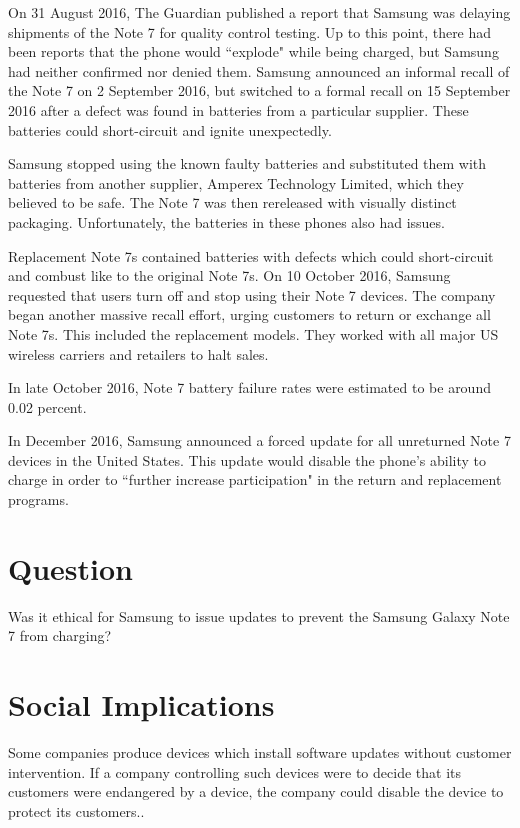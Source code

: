 \documentclass[12pt]{article}
\begin{document}
   On 31 August 2016, The Guardian published a report that Samsung was delaying shipments of the Note 7 for quality control testing\cite{guardian}. Up to this point, there had been reports that the phone would ``explode" while being charged, but Samsung had neither confirmed nor denied them\cite{yonhapnews}. Samsung announced an informal recall of the Note 7 on 2 September 2016, but switched to a formal recall on 15 September 2016 after a defect was found in batteries from a particular supplier\cite{recode}. These batteries could short-circuit and ignite unexpectedly.
   
   Samsung stopped using the known faulty batteries and substituted them with batteries from another supplier, Amperex Technology Limited, which they believed to be safe. The Note 7 was then rereleased with visually distinct packaging\cite{boxMarkedDifferent}\cite{greenBatteryIndicator}. Unfortunately, the batteries in these phones also had issues.
   
   Replacement Note 7s contained batteries with defects which could short-circuit and combust like to the original Note 7s\cite{anotherOne}. On 10 October 2016, Samsung requested that users turn off and stop using their Note 7 devices. The company began another massive recall effort, urging customers to return or exchange all Note 7s. This included the replacement models. They worked with all major US wireless carriers and retailers to halt sales.
   
   In late October 2016, Note 7 battery failure rates were estimated to be around 0.02 percent\cite{numbersOnFailureRates}.
   
   In December 2016, Samsung announced a forced update for all unreturned Note 7 devices in the United States\cite{samsungFullRecallAnnounce}\cite{facebookAutoInstallConfirmation}. This update would disable the phone's ability to charge in order to ``further increase participation" in the return and replacement programs.

\section{Question}
Was it ethical for Samsung to issue updates to prevent the Samsung Galaxy Note 7 from charging?

\section{Social Implications}
	Some companies produce devices which install software updates without customer intervention\cite{guardianRevlovBricked}\cite{amazonEchoInstallsUpdatesAutomatically}\cite{computerworldWindows10AutoInstallsUpdates}. If a company controlling such devices were to decide that its customers were endangered by a device, the company could disable the device to protect its customers.\cite{guardianRevlovBricked}.
	
\end{document}
